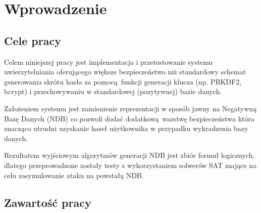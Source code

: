 \chapter{Wprowadzenie}
\section{Cele pracy}
Celem niniejszej pracy jest implementacja i przetestowanie systemu uwierzytelniania oferującego większe bezpieczeństwo
niż standardowy schemat generowania skrótu hasła za pomocą funkcji generacji klucza (np. PBKDF2, bcrypt) i przechowywaniu 
w standardowej (pozytywnej) bazie danych.

Założeniem systemu jest zamienienie reprezentacji w sposób jawny na Negatywną Bazę Danych (NDB) co pozwoli dodać dodatkową warstwę bezpieczeństwa
która znacząco utrudni uzyskanie haseł użytkownika w przypadku wykradzenia bazy danych.

Rezultatem wyjściowym algorytmów generacji NDB jest zbiór formuł logicznych, dlatego przeprowadzone zostały testy z wykorzystaniem solwerów SAT mające na celu zasymulowanie ataku na powstałą NDB.

\section{Zawartość pracy}

















